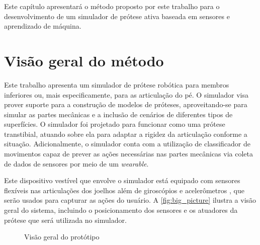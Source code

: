 Este capítulo apresentará o método proposto por este trabalho para o desenvolvimento de um simulador de prótese ativa baseada em sensores e aprendizado de máquina.

\section{Visão geral do método}\label{sec:metodo_protese}

Este trabalho apresenta um simulador de prótese robótica para membros inferiores ou, mais especificamente, para as articulação do pé. 
O simulador visa prover suporte para a construção de modelos de próteses,  
aproveitando-se para simular as partes mecânicas e a inclusão de cenários de diferentes tipos de superfícies.
O simulador foi projetado para funcionar como uma prótese transtibial, atuando sobre ela para adaptar a rigidez da articulação conforme a situação. Adicionalmente, o simulador conta com a utilização de classificador de movimentos capaz de prever as ações necessárias nas partes mecânicas via coleta de dados de sensores por meio de um \textit{wearable}.

Este dispositivo vestível que envolve o simulador está equipado com sensores flexíveis \cite{flex:datasheet} nas articulações dos joelhos além de giroscópios e acelerômetros \cite{invensense:imu_mpu}, que serão usados para capturar as ações do usuário. A \autoref{fig:big_picture} ilustra a visão geral do sistema, incluindo o posicionamento dos sensores e os atuadores da prótese que será utilizada no simulador.

\begin{figure}[h]
	\caption{\label{fig:big_picture}Visão geral do protótipo}
	\begin{center}
	\end{center}
\end{figure}

